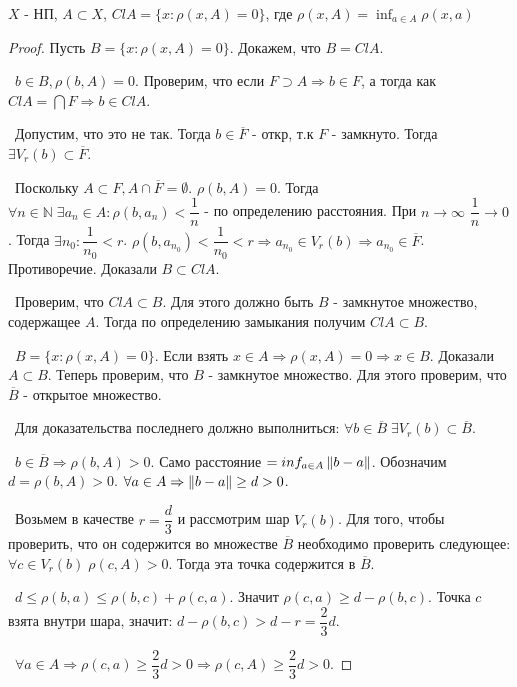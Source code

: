 \begin{theorem*}
    $X$ - НП, $A \subset X$, $Cl A = \{ x : \rho (x, A) = 0\}$, где $\rho(x, A) = \inf_{a \in A} \rho(x, a)$
\end{theorem*}
\begin{proof}
Пусть $B = \{ x : \rho (x, A) = 0\}$. Докажем, что $B = Cl A$.

\smallskip
\noindent \textbullet~$b \in B, \rho (b, A) = 0$. Проверим, что если $F \supset A \Rightarrow b \in F$, а тогда как $Cl A = \bigcap F \Rightarrow b \in Cl A$.

\smallskip
\noindent \textbullet~Допустим, что это не так. Тогда $b \in \overline{F}$ - откр, т.к $F$ - замкнуто. Тогда $\exists V_r(b) \subset \overline{F}$.

\smallskip
\noindent \textbullet~Поскольку $A \subset F, A \cap \overline{F} = \emptyset$. $\rho(b, A) = 0$. Тогда $\forall n \in \mathbb{N} \; \exists a_n \in A : \rho(b, a_n) < \dfrac{1}{n}$ - по определению расстояния. При $n \to \infty$ $\dfrac{1}{n} \to 0$. Тогда $\exists n_0 : \dfrac{1}{n_0} < r$. $\rho(b, a_{n_0}) < \dfrac{1}{n_0} < r \Rightarrow a_{n_0} \in V_r(b) \Rightarrow a_{n_0} \in \overline{F}$. Противоречие. Доказали $B \subset Cl A$.

\bigskip
\noindent \textbullet~Проверим, что $Cl A \subset B$. Для этого должно быть $B$ - замкнутое множество, содержащее $A$. Тогда по определению замыкания получим $Cl A \subset B$.

\smallskip
\noindent \textbullet~$B = \{ x : \rho(x, A) = 0\}$. Если взять $x \in A \Rightarrow \rho(x, A) = 0 \Rightarrow x \in B$. Доказали $A \subset B$. Теперь проверим, что $B$ - замкнутое множество. Для этого проверим, что $\overline{B}$ - открытое множество. 

\smallskip 
\noindent \textbullet~Для доказательства последнего должно выполниться: $\forall b \in \overline{B} \; \exists V_r(b) \subset \overline{B}$.

\smallskip 
\noindent \textbullet~$b \in \overline{B} \Rightarrow \rho(b, A) > 0$. Само расстояние $= inf_{a \in A} \left\lVert b - a\right\rVert$. Обозначим $d = \rho(b, A) > 0$. $\forall a \in A \Rightarrow \left\lVert b - a\right\rVert \ge d > 0$. 

\smallskip 
\noindent \textbullet~Возьмем в качестве $r = \dfrac{d}{3}$ и рассмотрим шар $V_r(b)$. Для того, чтобы проверить, что он содержится во множестве $\overline{B}$ необходимо проверить следующее: $\forall c \in V_r(b) \; \rho(c, A) > 0$. Тогда эта точка содержится в $\overline{B}$.

\smallskip 
\noindent \textbullet~$d \le \rho(b, a) \le \rho(b, c) + \rho(c, a)$. Значит $\rho(c, a) \ge d - \rho(b, c)$. Точка $c$ взята внутри шара, значит: $d - \rho(b, c) > d - r = \dfrac{2}{3} d$.

\smallskip 
\noindent \textbullet~$\forall a \in A \Rightarrow \rho(c, a) \ge \dfrac{2}{3} d > 0 \Rightarrow \rho(c, A) \ge \dfrac{2}{3} d > 0$.
\end{proof}

